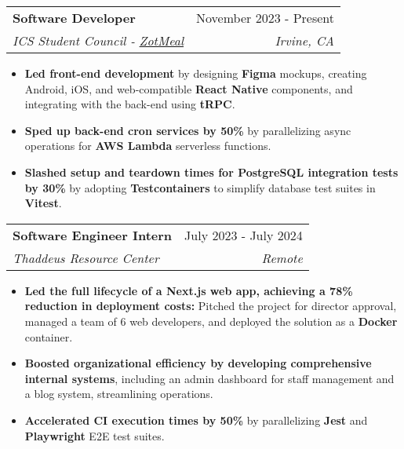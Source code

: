 \documentclass[letterpaper,11pt]{article}
\makeatletter
\newcommand{\resumeItem}[1]{
  \item\setstretch{.95}\small{
    {#1 \vspace{-2pt}}
  }
}
\newcommand{\resumeSubheading}[4]{
  \vspace{-2pt}\item
    \begin{tabular*}{0.97\textwidth}[t]{l@{\extracolsep{\fill}}r}
      \textbf{#1} & #2 \\
      \textit{\small#3} & \textit{\small #4} \\
    \end{tabular*}\vspace{-4.8pt}
}
\newcommand{\resumeItemListStart}{\begin{itemize}}
\newcommand{\resumeItemListEnd}{\end{itemize}\vspace{-5pt}}
\makeatother
\begin{document}
  \resumeSubheading
  {Software Developer}{November 2023 - Present}
  {ICS Student Council - \href{https://github.com/icssc/ZotMeal}{ZotMeal}}{Irvine, CA}
  \resumeItemListStart
    \resumeItem{\textbf{Led front-end development} by designing \textbf{Figma} mockups, creating Android, iOS, and web-compatible \textbf{React Native} components, and integrating with the back-end using \textbf{tRPC}.}
    \resumeItem{\textbf{Sped up back-end cron services by 50\%} by parallelizing async operations for \textbf{AWS Lambda} serverless functions.}
    \resumeItem{\textbf{Slashed setup and teardown times for PostgreSQL integration tests by 30\%} by adopting \textbf{Testcontainers} to simplify database test suites in \textbf{Vitest}.}
  \resumeItemListEnd

  \resumeSubheading
    {Software Engineer Intern}{July 2023 - July 2024}
    {Thaddeus Resource Center}{Remote}
    \resumeItemListStart
      \resumeItem{\textbf{Led the full lifecycle of a Next.js web app, achieving a 78\% reduction in deployment costs:} Pitched the project for director approval, managed a team of 6 web developers, and deployed the solution as a \textbf{Docker} container.} 
      \resumeItem{\textbf{Boosted organizational efficiency by developing comprehensive internal systems}, including an admin dashboard for staff management and a blog system, streamlining operations.}
      \resumeItem{\textbf{Accelerated CI execution times by 50\%} by parallelizing \textbf{Jest} and \textbf{Playwright} E2E test suites.}
    \resumeItemListEnd
\end{document}
